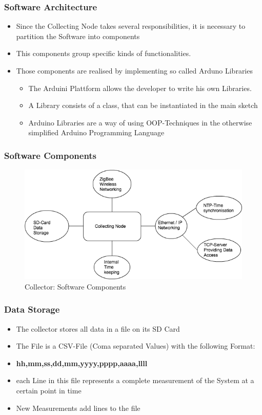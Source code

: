\documentclass{beamer}
\begin{document}
\begin{frame}
	\frametitle{Software Architecture}
	\begin{itemize}
		\item Since the Collecting Node takes several responsibilities, it is necessary to partition the Software into components
		\item This components group specific kinds of functionalities.
		\item Those components are realised by implementing so called Arduno Libraries
		\begin{itemize}
			\item The Arduini Plattform allows the developer to write his own Libraries.
			\item A Library consists of a class, that can be instantiated in the main sketch
			\item Arduino Libraries are a way of using OOP-Techniques in the otherwise simplified Arduino Programming Language
		\end{itemize}
	\end{itemize}
\end{frame}



\begin{frame}
	\frametitle{Software Components}
			\begin{figure}[h!]
  		\centering
    	\includegraphics[width=\textwidth]{../Images/collector_software_components.png}
		\caption{Collector: Software Components}
	\end{figure}
\end{frame}

\begin{frame}
	\frametitle{Data Storage}
	\begin{itemize}
		\item The collector stores all data in a file on its SD Card
		\item The File is a CSV-File (Coma separated Values) with the following Format:
		\item \textbf{hh,mm,ss,dd,mm,yyyy,pppp,aaaa,llll}
		\item each Line in this file represents a complete measurement of the System at a certain point in time
		\item New Measurements add lines to the file
	\end{itemize}
\end{frame}
\end{document}
